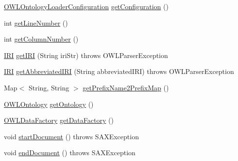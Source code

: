 \begin{DoxyCompactItemize}
\item 
\hyperlink{classorg_1_1semanticweb_1_1owlapi_1_1model_1_1_o_w_l_ontology_loader_configuration}{O\-W\-L\-Ontology\-Loader\-Configuration} \hyperlink{classorg_1_1coode_1_1owlapi_1_1owlxmlparser_1_1_o_w_l_x_m_l_parser_handler_afd178fff94649687f904801d8e1e4e8f}{get\-Configuration} ()
\item 
int \hyperlink{classorg_1_1coode_1_1owlapi_1_1owlxmlparser_1_1_o_w_l_x_m_l_parser_handler_abd8eef93f1656d0c51eee608cc136218}{get\-Line\-Number} ()
\item 
int \hyperlink{classorg_1_1coode_1_1owlapi_1_1owlxmlparser_1_1_o_w_l_x_m_l_parser_handler_a0daa0b42e120af5a1c5196ba66f978b9}{get\-Column\-Number} ()
\item 
\hyperlink{classorg_1_1semanticweb_1_1owlapi_1_1model_1_1_i_r_i}{I\-R\-I} \hyperlink{classorg_1_1coode_1_1owlapi_1_1owlxmlparser_1_1_o_w_l_x_m_l_parser_handler_a7a833d1d6fa5af0e0c887ad5ddde1ef3}{get\-I\-R\-I} (String iri\-Str)  throws O\-W\-L\-Parser\-Exception 
\item 
\hyperlink{classorg_1_1semanticweb_1_1owlapi_1_1model_1_1_i_r_i}{I\-R\-I} \hyperlink{classorg_1_1coode_1_1owlapi_1_1owlxmlparser_1_1_o_w_l_x_m_l_parser_handler_a96b1d76ae5d2074db894ada026cb6c0a}{get\-Abbreviated\-I\-R\-I} (String abbreviated\-I\-R\-I)  throws O\-W\-L\-Parser\-Exception 
\item 
Map$<$ String, String $>$ \hyperlink{classorg_1_1coode_1_1owlapi_1_1owlxmlparser_1_1_o_w_l_x_m_l_parser_handler_ada91b80be7ba8d06c55c90abe54365e6}{get\-Prefix\-Name2\-Prefix\-Map} ()
\item 
\hyperlink{interfaceorg_1_1semanticweb_1_1owlapi_1_1model_1_1_o_w_l_ontology}{O\-W\-L\-Ontology} \hyperlink{classorg_1_1coode_1_1owlapi_1_1owlxmlparser_1_1_o_w_l_x_m_l_parser_handler_a0ff487fef232c9de5ed10e2d10435b7d}{get\-Ontology} ()
\item 
\hyperlink{interfaceorg_1_1semanticweb_1_1owlapi_1_1model_1_1_o_w_l_data_factory}{O\-W\-L\-Data\-Factory} \hyperlink{classorg_1_1coode_1_1owlapi_1_1owlxmlparser_1_1_o_w_l_x_m_l_parser_handler_afbba0e272aaeba3cda41c2db4fef0ee8}{get\-Data\-Factory} ()
\item 
void \hyperlink{classorg_1_1coode_1_1owlapi_1_1owlxmlparser_1_1_o_w_l_x_m_l_parser_handler_a6621ae9ca8569b3daa0db82e0dc7fd45}{start\-Document} ()  throws S\-A\-X\-Exception 
\item 
void \hyperlink{classorg_1_1coode_1_1owlapi_1_1owlxmlparser_1_1_o_w_l_x_m_l_parser_handler_a789ec885b87a87006dff49ce00b7f1a2}{end\-Document} ()  throws S\-A\-X\-Exception 

\end{DoxyCompactItemize}

